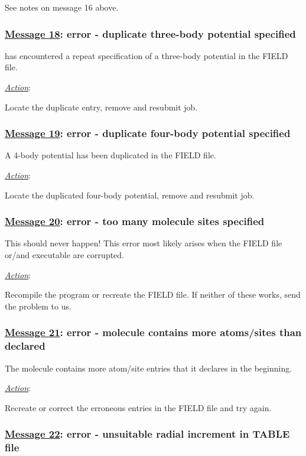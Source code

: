 See notes on message 16 above.

\subsubsection*{\underline{Message 18}: error - duplicate three-body potential specified}

\D has encountered a repeat specification of a three-body
potential in the FIELD file.

\noindent \underline{\em Action}:

Locate the duplicate entry, remove and resubmit job.

\subsubsection*{\underline{Message 19}: error - duplicate four-body potential specified}

A 4-body potential has been duplicated in the FIELD file.

\noindent \underline{\em Action}:

Locate the duplicated four-body
potential, remove and resubmit job.

\subsubsection*{\underline{Message 20}: error - too many molecule sites specified}

This should never happen!  This error most likely arises when the
FIELD file or/and \D executable are corrupted.

\noindent \underline{\em Action}:

Recompile the program or recreate the FIELD file.  If neither of
these works, send the problem to us.

\subsubsection*{\underline{Message 21}: error - molecule contains more atoms/sites than declared}

The molecule contains more atom/site entries that it declares in the beginning.

\noindent \underline{\em Action}:

Recreate or correct the erroneous entries in the FIELD file and try again.

\subsubsection*{\underline{Message 22}: error - unsuitable radial increment in TABLE file}

